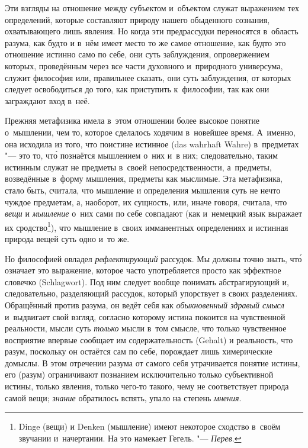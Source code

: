 Эти взгляды на отношение между субъектом и~объектом служат выражением тех
определений, которые составляют природу нашего обыденного
сознания, охватывающего лишь явления. Но когда эти предрассудки переносятся в~область разума, как будто
и в~нём имеет место то же самое отношение, как будто это отношение истинно
само по себе,
они суть заблуждения, опровержением которых, проведённым
через все части духовного и~природного универсума, служит философия или,
правильнее сказать, они суть заблуждения, от которых следует
освободиться до того, как приступить к~философии, так как они заграждают
вход в~неё.

Прежняя метафизика имела в~этом отношении более высокое понятие о~мышлении,
чем то, которое сделалось ходячим в~новейшее время. А~именно, она исходила из
того, что поистине истинное (das wahrhaft Wahre) в~предметах "--- это то, чт\'{о} познаётся
мышлением о~них и~в них;
следовательно, таким истинным служат не предметы в~своей
непосредственности, а~предметы, возведённые в~форму мышления,
предметы как мыслимые. Эта метафизика, стало быть, считала, что мышление и
определения мышления суть не нечто чуждое предметам, а, наоборот, их
сущность, или, иначе говоря, считала, что {\em вещи} и
{\em мышление} о~них сами по себе совпадают (как и~немецкий
язык выражает их сродство\footnote{Dinge (вещи) и Denken (мышление) имеют
некоторое сходство в~своём звучании и~начертании. На это намекает
Гегель. "--- {\em Перев}.}), что мышление в~своих имманентных определениях
и истинная природа вещей суть одно и~то же.

Но философией овладел {\em рефлектирующий} рассудок. Мы
должны точно знать, чт\'{о} означает это выражение, которое часто употребляется
просто как эффектное словечко (Schlagwort). Под ним следует вообще понимать
абстрагирующий и, следовательно, разделяющий рассудок, который упорствует в
своих разделениях. Обращённый против разума, он ведёт себя как
{\em обыкновенный здравый смысл} и~выдвигает свой
взгляд, согласно которому истина покоится на чувственной реальности, мысли
суть {\em только} мысли в~том смысле, что только
чувственное восприятие впервые сообщает им содержательность (Gehalt) и
реальность, что разум, поскольку он остаётся сам по себе, порождает лишь
химерические домыслы.
В этом отречении разума от самого себя утрачивается понятие истины, его
(разум) ограничивают познанием исключительно только субъективной истины,
только явления, только чего-то такого, чему не соответствует природа самой
вещи; {\em знание} обратилось вспять, упало на степень {\em мнения}.

